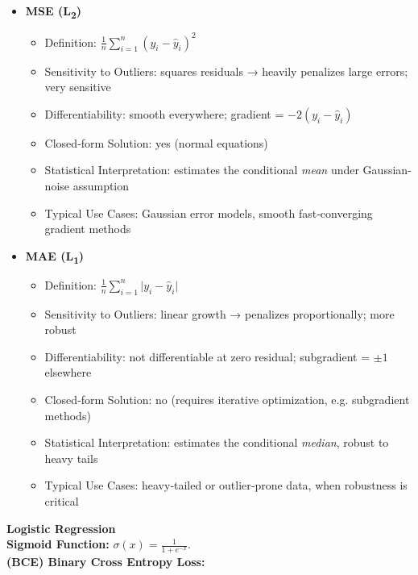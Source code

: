 \documentclass[8pt,twocolumn]{article}
\begin{document}
\begin{itemize}
    \setlength{\itemsep}{0pt}
    \setlength{\parskip}{0pt}
    \item \textbf{MSE (L\textsubscript{2})} \vspace{-0.6em}
      \begin{itemize}
        \setlength{\itemsep}{0pt}
        \setlength{\parskip}{0pt}
        \item Definition: \(\frac{1}{n}\sum_{i=1}^n (y_i - \hat y_i)^2\)
        \item Sensitivity to Outliers: squares residuals → heavily penalizes large errors; very sensitive
        \item Differentiability: smooth everywhere; gradient = \(-2(y_i-\hat y_i)\)
        \item Closed‐form Solution: yes (normal equations)
        \item Statistical Interpretation: estimates the conditional \emph{mean} under Gaussian‐noise assumption
        \item Typical Use Cases: Gaussian error models, smooth fast‐converging gradient methods
      \end{itemize}
    \item \textbf{MAE (L\textsubscript{1})} \vspace{-0.6em}
      \begin{itemize}
        \setlength{\itemsep}{0pt}
        \setlength{\parskip}{0pt}
        \item Definition: \(\frac{1}{n}\sum_{i=1}^n \lvert y_i - \hat y_i\rvert\)
        \item Sensitivity to Outliers: linear growth → penalizes proportionally; more robust
        \item Differentiability: not differentiable at zero residual; subgradient = \(\pm1\) elsewhere
        \item Closed‐form Solution: no (requires iterative optimization, e.g. subgradient methods)
        \item Statistical Interpretation: estimates the conditional \emph{median}, robust to heavy tails
        \item Typical Use Cases: heavy‐tailed or outlier‐prone data, when robustness is critical
      \end{itemize}
  \end{itemize}
\textbf{Logistic Regression}\\
\textbf{Sigmoid Function:} $\sigma(x) = \frac{1}{1 + e^{-x}}$. \\
\textbf{(BCE) Binary Cross Entropy Loss:}
\end{document}
